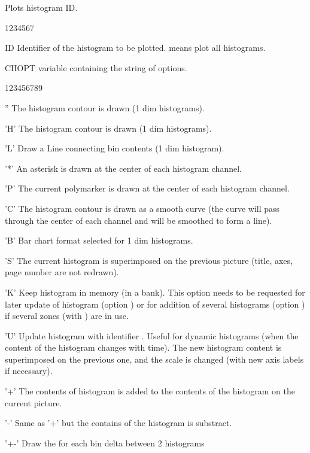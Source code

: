 \Action
Plots histogram ID.
\Pdesc
\begin{DLtt}{1234567}
\item[ID]      Identifier of the histogram to be plotted.  means plot 
               all histograms.
\item[CHOPT]   \CHARACTER{} variable containing the string of options.
\begin{DLtt}{123456789}
\item['']      The histogram contour is drawn (1 dim histograms).
\item['H']     The histogram contour is drawn (1 dim histograms).
\item['L']     Draw a Line connecting bin contents (1 dim histogram).
\item['*']     An asterisk is drawn at the center of each histogram channel.
\item['P']     The current polymarker is drawn at the center of each histogram 
               channel.
\item['C']     The histogram contour is drawn as a smooth curve (the curve will 
               pass through the center of each channel and will be smoothed to 
               form a line).
\item['B']     Bar chart format selected for 1 dim histograms.
\item['S']     The current histogram is superimposed on the previous picture 
               (title, axes, page number are not redrawn).
\item['K']     Keep histogram in memory (in a \ZEBRA{} bank). This option needs 
               to be requested for later update of histogram (option ) 
               or for addition of several histograms (option ) if 
               several zones (with ) are in use.
\item['U']     Update histogram with identifier . Useful for dynamic 
               histograms (when the content of the histogram changes with time).
               The new histogram content is superimposed on the previous one, 
               and the scale is changed (with new axis labels if necessary).
\item['+']     The contents of histogram  is added to the contents of 
               the histogram on the current picture.
\item['-']     Same as '+' but the contains of the histogram is substract.
\item['+-']    Draw the for each bin delta between 2 histograms

\end{DLtt}
\end{DLtt}
